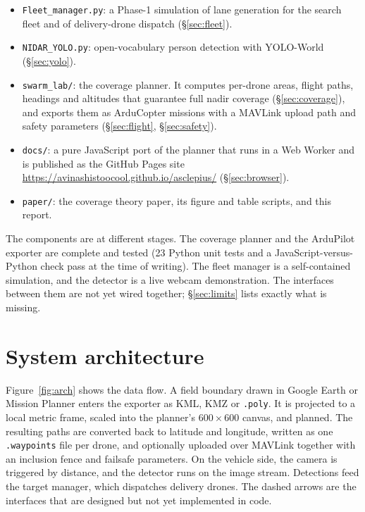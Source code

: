 \documentclass[11pt,a4paper]{article}
\newcommand{\code}[1]{\texttt{#1}}
\begin{document}
\begin{itemize}
  \item \code{Fleet\_manager.py}: a Phase-1 simulation of lane generation for the search fleet and of
        delivery-drone dispatch (\S\ref{sec:fleet}).
  \item \code{NIDAR\_YOLO.py}: open-vocabulary person detection with YOLO-World (\S\ref{sec:yolo}).
  \item \code{swarm\_lab/}: the coverage planner. It computes per-drone areas, flight paths, headings and
        altitudes that guarantee full nadir coverage (\S\ref{sec:coverage}), and exports them as ArduCopter
        missions with a MAVLink upload path and safety parameters (\S\ref{sec:flight}, \S\ref{sec:safety}).
  \item \code{docs/}: a pure JavaScript port of the planner that runs in a Web Worker and is published as
        the GitHub Pages site \url{https://avinashistoocool.github.io/asclepius/} (\S\ref{sec:browser}).
  \item \code{paper/}: the coverage theory paper, its figure and table scripts, and this report.
\end{itemize}

The components are at different stages. The coverage planner and the ArduPilot exporter are complete and
tested (23 Python unit tests and a JavaScript-versus-Python check pass at the time of writing). The fleet
manager is a self-contained simulation, and the detector is a live webcam demonstration. The interfaces
between them are not yet wired together; \S\ref{sec:limits} lists exactly what is missing.

\section{System architecture}
\label{sec:arch}

Figure~\ref{fig:arch} shows the data flow. A field boundary drawn in Google Earth or Mission Planner enters
the exporter as KML, KMZ or \code{.poly}. It is projected to a local metric frame, scaled into the
planner's $600\times600$ canvas, and planned. The resulting paths are converted back to latitude and
longitude, written as one \code{.waypoints} file per drone, and optionally uploaded over MAVLink together
with an inclusion fence and failsafe parameters. On the vehicle side, the camera is triggered by distance,
and the detector runs on the image stream. Detections feed the target manager, which dispatches delivery
drones. The dashed arrows are the interfaces that are designed but not yet implemented in code.
\end{document}
